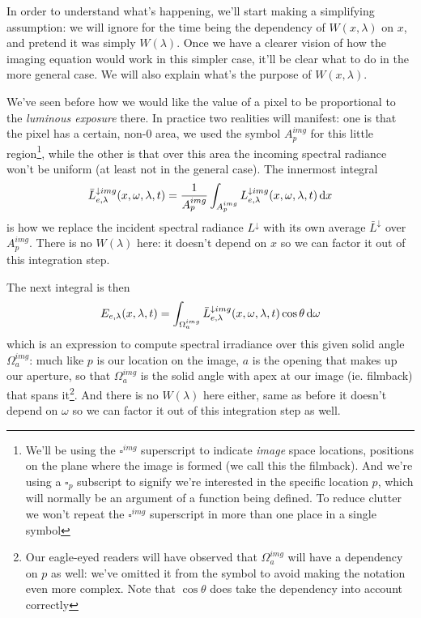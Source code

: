 In order to understand what's happening, we'll start making a simplifying assumption:
we will ignore for the time being the dependency of $W(x,\lambda)$ on $x$, and pretend it was simply
$W(\lambda)$. Once we have a clearer vision of how the imaging equation would work in this
simpler case, it'll be clear what to do in the more general case. We will also explain
what's the purpose of $W(x,\lambda)$.

We've seen before how we would like the value of a pixel to be proportional 
to the \textsl{luminous \gls{exposure}} there. In practice two realities will 
manifest: one is that the pixel has a certain, non-$0$ area, we used the symbol
$A^{img}_p$ for this little region\footnote{
	We'll be using the $\square^{img}$ superscript to indicate \textsl{\gls{image}} space 
	locations, positions on the plane where the image is formed (we call this 
	the \gls{filmback}). And we're using a $\square_p$ subscript to signify we're 
	interested in the specific location $p$, which will normally be an argument of a 
	function being defined. To reduce clutter we won't repeat the $\square^{img}$ 
	superscript in more than one place in a single symbol}, while the other is that over this area the incoming \gls{spectral} 
\gls{radiance} won't be uniform (at least not in the general case). 
The innermost integral
\begin{displaymath}
	\bar L^{\downarrow img}_{e,\lambda}(x, \omega, \lambda, t) = \frac1{A_p^{img}} \int_{A_p^{img}} L^{\downarrow img}_{e,\lambda}(x, \omega, \lambda, t) \mathop{}\!\mathrm{d} x
\end{displaymath}
is how we replace the incident \gls{spectral} \gls{radiance} $L^{\downarrow}$ with 
its own average $\bar L^{\downarrow}$ over $A^{img}_p$. There is no $W(\lambda)$ here:
it doesn't depend on $x$ so we can factor it out of this integration step.

The next integral is then 
\begin{displaymath}
	E_{e,\lambda}(x,\lambda,t) = \int_{\Omega^{img}_a} \bar L^{\downarrow img}_{e,\lambda}(x, \omega, \lambda, t) \cos\theta \mathop{}\!\mathrm{d}\omega
\end{displaymath}
which is an expression to compute \gls{spectral} \gls{irradiance} over this given
solid angle $\Omega^{img}_a$: much like $p$ is our location on the image, 
$a$ is the opening that makes up our aperture, so that 
$\Omega^{img}_a$ is the solid angle with apex at our image (ie. filmback) that spans it\footnote{
	Our eagle-eyed readers will have observed that $\Omega^{img}_a$ will have a dependency 
	on $p$ as well: we've omitted it from the symbol to avoid making the notation even 
	more complex. Note that $\cos\theta$ does take the dependency into account correctly}.
And there is no $W(\lambda)$ here either, same as before it doesn't depend on $\omega$ so 
we can factor it out of this integration step as well.

